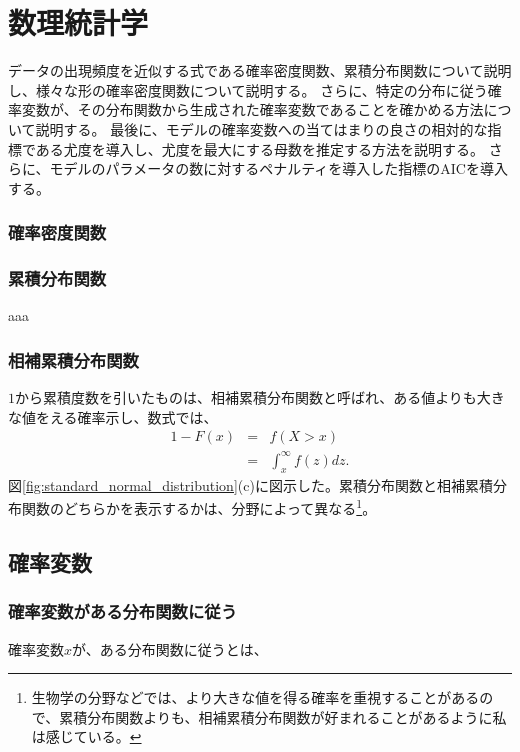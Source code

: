 \chapter{数理統計学}
データの出現頻度を近似する式である確率密度関数、累積分布関数について説明し、様々な形の確率密度関数について説明する。
さらに、特定の分布に従う確率変数が、その分布関数から生成された確率変数であることを確かめる方法について説明する。
最後に、モデルの確率変数への当てはまりの良さの相対的な指標である尤度を導入し、尤度を最大にする母数を推定する方法を説明する。
さらに、モデルのパラメータの数に対するペナルティを導入した指標のAICを導入する。

\subsection{確率密度関数}

\subsection{累積分布関数}
aaa

\subsection{相補累積分布関数}
$1$から累積度数を引いたものは、相補累積分布関数と呼ばれ、ある値よりも大きな値をえる確率示し、数式では、
\begin{eqnarray}
    1-F(x) &=& f(X>x) \\
        &=& \int_{x}^{\infty} f(z)dz.
\end{eqnarray}
図\ref{fig:standard_normal_distribution}(c)に図示した。累積分布関数と相補累積分布関数のどちらかを表示するかは、分野によって異なる\footnote{生物学の分野などでは、より大きな値を得る確率を重視することがあるので、累積分布関数よりも、相補累積分布関数が好まれることがあるように私は感じている。}。

\section{確率変数}
\subsection{確率変数がある分布関数に従う}
確率変数$x$が、ある分布関数に従うとは、



